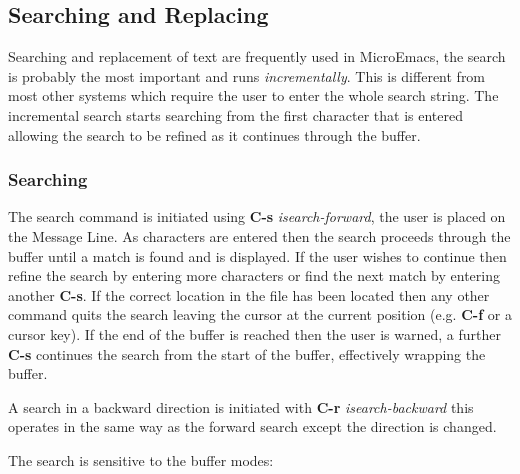 \documentclass[11pt,a4paper,pdftex]{article}
\begin{document}
\subsection{Searching and Replacing}

  Searching and replacement of text are frequently used in MicroEmacs, the
  search is probably the most important and runs \textit{incrementally}. This
  is different from most other systems which require the user to enter the
  whole search string. The incremental search starts searching from the first
  character that is entered allowing the search to be refined as it continues
  through the buffer.

\subsubsection{Searching}

  The search command is initiated using \textbf{C-s} \textit{isearch-forward},
  the user is placed on the Message Line. As characters are entered then the
  search proceeds through the buffer until a match is found and is displayed.
  If the user wishes to continue then refine the search by entering more
  characters or find the next match by entering another \textbf{C-s}. If the
  correct location in the file has been located then any other command quits
  the search leaving the cursor at the current position (e.g. \textbf{C-f} or
  a cursor key). If the end of the buffer is reached then the user is warned,
  a further \textbf{C-s} continues the search from the start of the buffer,
  effectively wrapping the buffer.

  A search in a backward direction is initiated with \textbf{C-r}
  \textit{isearch-backward} this operates in the same way as the forward
  search except the direction is changed.

  The search is sensitive to the buffer modes:
\end{document}
